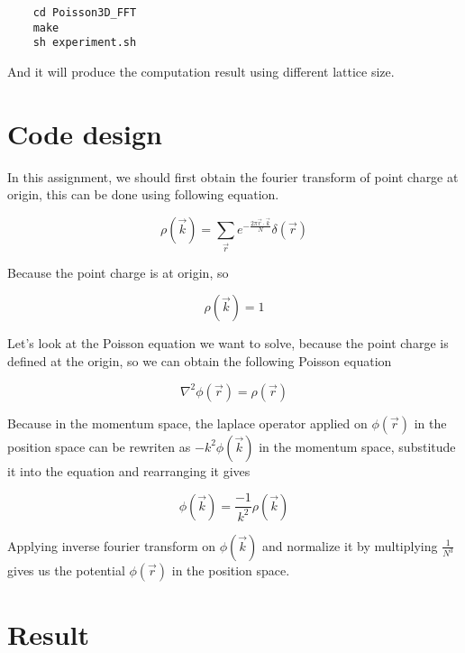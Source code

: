 \documentclass{article}
\begin{document}
	\begin{verbatim}
	cd Poisson3D_FFT
	make
	sh experiment.sh
	\end{verbatim}
	
	And it will produce the computation result using different lattice size.
	
	\section{Code design}
	In this assignment, we should first obtain the fourier transform of point charge at origin, this can be done using following equation.
	
	\begin{equation}
		\rho(\overrightarrow{k})=\sum_{\overrightarrow{r}}e^{-\frac{2\pi \overrightarrow{r} \cdot \overrightarrow{k}}{N}} \delta({\overrightarrow{r}})
	\end{equation}

	Because the point charge is at origin, so
	
	\begin{equation}
		\rho(\overrightarrow{k})=1
	\end{equation}
	
	Let's look at the Poisson equation we want to solve, because the point charge is defined at the origin, so we can obtain the following Poisson equation
	
	\begin{equation}
		\nabla^2\phi(\overrightarrow{r})=\rho(\overrightarrow{r})
	\end{equation}
	
	Because in the momentum space, the laplace operator applied on $\phi(\overrightarrow{r})$ in the position space can be rewriten as $-k^2\phi(\overrightarrow{k})$ in the momentum space, substitude it into the equation and rearranging it gives

	\begin{equation}
	\phi(\overrightarrow{k})=\frac{-1}{k^2}\rho(\overrightarrow{k})
	\end{equation}
	
	Applying inverse fourier transform on $\phi(\overrightarrow{k})$ and normalize it by multiplying $\frac{1}{N^3}$ gives us the potential $\phi(\overrightarrow{r})$ in the position space. 

	\section{Result}
\end{document}
